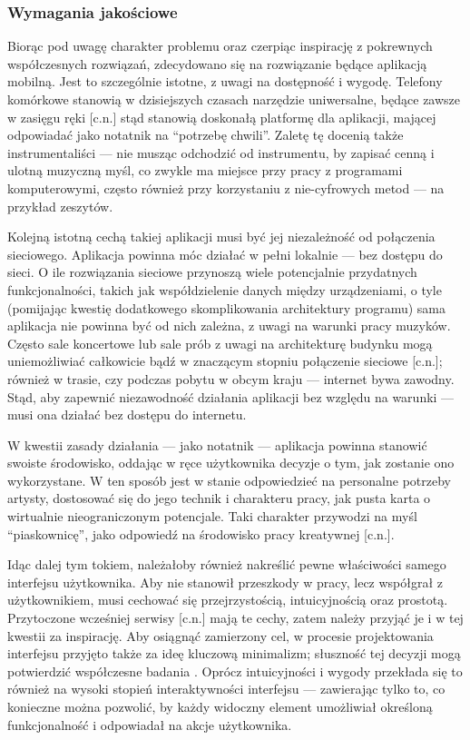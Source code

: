 \documentclass[12pt]{article}
\begin{document}
\subsubsection{Wymagania jakościowe}
Biorąc pod uwagę charakter problemu oraz czerpiąc inspirację z pokrewnych współczesnych rozwiązań,
zdecydowano się na rozwiązanie będące aplikacją mobilną.
Jest to szczególnie istotne, z uwagi na dostępność i wygodę.
Telefony komórkowe stanowią w dzisiejszych czasach narzędzie uniwersalne, będące zawsze w zasięgu ręki [c.n.]
stąd stanowią doskonałą platformę dla aplikacji, mającej odpowiadać jako notatnik na \enquote{potrzebę chwili}.
Zaletę tę docenią także instrumentaliści — nie musząc odchodzić od instrumentu, by zapisać cenną i ulotną muzyczną myśl,
co zwykle ma miejsce przy pracy z programami komputerowymi, często również przy korzystaniu z nie-cyfrowych metod
— na przykład zeszytów.

Kolejną istotną cechą takiej aplikacji musi być jej niezależność od połączenia sieciowego.
Aplikacja powinna móc działać w pełni lokalnie — bez dostępu do sieci.
O ile rozwiązania sieciowe przynoszą wiele potencjalnie przydatnych funkcjonalności,
takich jak współdzielenie danych między urządzeniami,
o tyle (pomijając kwestię dodatkowego skomplikowania architektury programu)
sama aplikacja nie powinna być od nich zależna, z uwagi na warunki pracy muzyków.
Często sale koncertowe lub sale prób z uwagi na architekturę budynku mogą uniemożliwiać całkowicie
bądź w znaczącym stopniu połączenie sieciowe [c.n.]; również w trasie, czy podczas pobytu w obcym kraju
— internet bywa zawodny.
Stąd, aby zapewnić niezawodność działania aplikacji bez względu na warunki — musi ona działać bez dostępu do internetu.

W kwestii zasady działania — jako notatnik — aplikacja powinna stanowić swoiste środowisko,
oddając w ręce użytkownika decyzje o tym, jak zostanie ono wykorzystane.
W ten sposób jest w stanie odpowiedzieć na personalne potrzeby artysty, dostosować się do jego technik i charakteru pracy,
jak pusta karta o wirtualnie nieograniczonym potencjale.
Taki charakter przywodzi na myśl \enquote{piaskownicę}, jako odpowiedź na środowisko pracy kreatywnej [c.n.].

Idąc dalej tym tokiem, należałoby również nakreślić pewne właściwości samego interfejsu użytkownika.
Aby nie stanowił przeszkody w pracy, lecz współgrał z użytkownikiem, musi cechować się przejrzystością,
intuicyjnością oraz prostotą.
Przytoczone wcześniej serwisy [c.n.] mają te cechy, zatem należy przyjąć je i w tej kwestii za inspirację.
Aby osiągnąć zamierzony cel, w procesie projektowania interfejsu przyjęto także za ideę kluczową minimalizm;
słuszność tej decyzji mogą potwierdzić współczesne badania \cite{minimalism}.
Oprócz intuicyjności i wygody przekłada się to również na wysoki stopień interaktywności interfejsu — zawierając tylko to,
co konieczne można pozwolić, by każdy widoczny element umożliwiał określoną funkcjonalność
i odpowiadał na akcje użytkownika.
\end{document}
